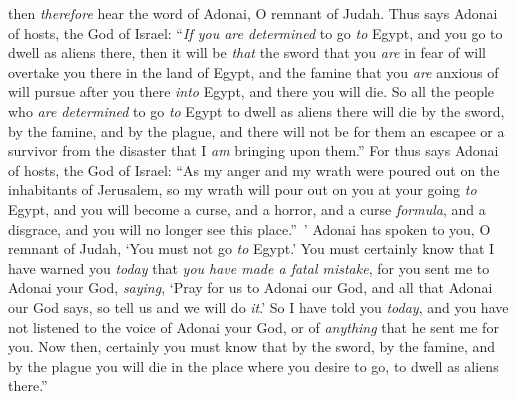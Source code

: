 \begin{biblechapter}
\verse then \textit{therefore} hear the word of Adonai, O remnant of Judah. Thus says Adonai of hosts, the God of Israel: “\textit{If you are determined} to go \textit{to} Egypt, and you go to dwell as aliens there,
\verse then it will be \textit{that} the sword that you \textit{are} in fear of will overtake you there in the land of Egypt, and the famine that you \textit{are} anxious of will pursue after you there \textit{into} Egypt, and there you will die.
\verse So all the people who \textit{are determined} to go \textit{to} Egypt to dwell as aliens there will die by the sword, by the famine, and by the plague, and there will not be for them an escapee or a survivor from the disaster that I \textit{am} bringing upon them.”
\verse For thus says Adonai of hosts, the God of Israel: “As my anger and my wrath were poured out on the inhabitants of Jerusalem, so my wrath will pour out on you at your going \textit{to} Egypt, and you will become a curse, and a horror, and a curse \textit{formula}, and a disgrace, and you will no longer see this place.” ’
\verse Adonai has spoken to you, O remnant of Judah, ‘You must not go \textit{to} Egypt.’ You must certainly know that I have warned you \textit{today}
\verse that \textit{you have made a fatal mistake}, for you sent me to Adonai your God, \textit{saying}, ‘Pray for us to Adonai our God, and all that Adonai our God says, so tell us and we will do \textit{it}.’
\verse So I have told you \textit{today}, and you have not listened to the voice of Adonai your God, or of \textit{anything} that he sent me for you.
\verse Now then, certainly you must know that by the sword, by the famine, and by the plague you will die in the place where you desire to go, to dwell as aliens there.”
\end{biblechapter}

